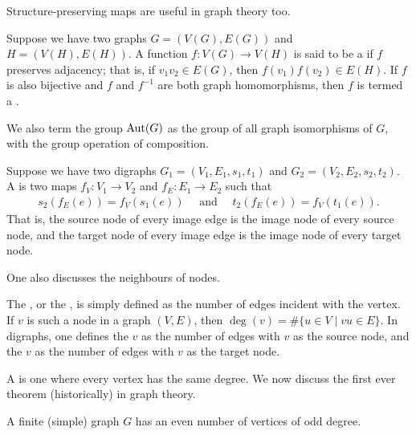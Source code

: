 Structure-preserving maps are useful in graph theory too.

\begin{definition}
    Suppose we have two graphs $G = (V(G),E(G))$ and $H = (V(H),E(H))$. A function $f:V(G) \to V(H)$ is said to be a  if $f$ preserves adjacency; that is, if $v_{1}v_{2} \in E(G)$, then $f(v_{1})f(v_{2}) \in E(H)$. If $f$ is also bijective and $f$ and $f^{-1}$ are both graph homomorphisms, then $f$ is termed a .
\end{definition}

We also term the group $\operatorname{Aut}(G)$ as the group of all graph isomorphisms of $G$, with the group operation of composition.

\begin{definition}
    Suppose we have two digraphs $G_{1} = (V_{1},E_{1},s_{1},t_{1})$ and $G_{2} = (V_{2},E_{2},s_{2},t_{2})$. A  is two maps $f_{V}:V_{1} \to V_{2}$ and $f_{E}:E_{1} \to E_{2}$ such that
    \begin{align}
        s_{2}(f_{E}(e)) = f_{V}(s_{1}(e)) \quad \text{ and } \quad t_{2}(f_{E}(e)) = f_{V}(t_{1}(e)).
    \end{align}
    That is, the source node of every image edge is the image node of every source node, and the target node of every image edge is the image node of every target node.
\end{definition}

One also discusses the neighbours of nodes.

\begin{definition}
    The , or the , is simply defined as the number of edges incident with the vertex. If $v$ is such a node in a graph $(V,E)$, then $\deg(v) = \#\{u \in V \mid vu \in E\}$. In digraphs, one defines the  $v$ as the number of edges with $v$ as the source node, and the  $v$ as the number of edges with $v$ as the target node.
\end{definition}

A  is one where every vertex has the same degree. We now discuss the first ever theorem (historically) in graph theory.

\begin{theorem}
    A finite (simple) graph $G$ has an even number of vertices of odd degree.
\end{theorem}

